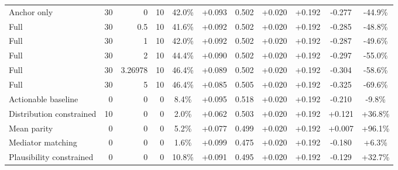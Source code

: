 \begin{table}[htbp]
\begin{tabular}{lrrrccccccc}
Anchor only & 30 & 0 & 10 & 42.0\% & +0.093 & 0.502 & +0.020 & +0.192 & -0.277 & -44.9\% \\
Full & 30 & 0.5 & 10 & 41.6\% & +0.092 & 0.502 & +0.020 & +0.192 & -0.285 & -48.8\% \\
Full & 30 & 1 & 10 & 42.0\% & +0.092 & 0.502 & +0.020 & +0.192 & -0.287 & -49.6\% \\
Full & 30 & 2 & 10 & 44.4\% & +0.090 & 0.502 & +0.020 & +0.192 & -0.297 & -55.0\% \\
Full & 30 & 3.26978 & 10 & 46.4\% & +0.089 & 0.502 & +0.020 & +0.192 & -0.304 & -58.6\% \\
Full & 30 & 5 & 10 & 46.4\% & +0.085 & 0.505 & +0.020 & +0.192 & -0.325 & -69.6\% \\
Actionable baseline & 0 & 0 & 0 & 8.4\% & +0.095 & 0.518 & +0.020 & +0.192 & -0.210 & -9.8\% \\
Distribution constrained & 10 & 0 & 0 & 2.0\% & +0.062 & 0.503 & +0.020 & +0.192 & +0.121 & +36.8\% \\
Mean parity & 0 & 0 & 0 & 5.2\% & +0.077 & 0.499 & +0.020 & +0.192 & +0.007 & +96.1\% \\
Mediator matching & 0 & 0 & 0 & 1.6\% & +0.099 & 0.475 & +0.020 & +0.192 & -0.180 & +6.3\% \\
Plausibility constrained & 0 & 0 & 0 & 10.8\% & +0.091 & 0.495 & +0.020 & +0.192 & -0.129 & +32.7\% \\
\bottomrule
\end{tabular}
\end{table}
